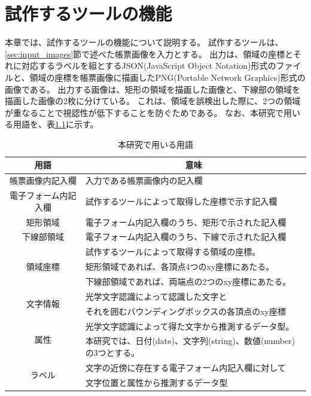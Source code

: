 \chapter{試作するツールの機能}\label{cha:Function}
本章では、試作するツールの機能について説明する。
試作するツールは、\ref{sec:input_images}節で述べた帳票画像を入力とする。
出力は、領域の座標とそれに対応するラベルを組とするJSON(JavaScript Object Notation)形式のファイルと、領域の座標を帳票画像に描画したPNG(Portable Network Graphics)形式の画像である。
出力する画像は、矩形の領域を描画した画像と、下線部の領域を描画した画像の2枚に分けている。
これは、領域を誤検出した際に、2つの領域が重なることで視認性が低下することを防ぐためである。
なお、本研究で用いる用語を、表\ref{tb:term}に示す。
\begin{table}[tp]
	\caption{本研究で用いる用語}
	\label{tb:term}
	\centering
	\begin{tabular}{|c||l|}
        \hline
		用語 & \multicolumn{1}{c|}{意味} \\
        \hline \hline
		帳票画像内記入欄 & 入力である帳票画像内の記入欄 \\
        \hline
		電子フォーム内記入欄 & 試作するツールによって取得した座標で示す記入欄 \\
        \hline
		矩形領域 & 電子フォーム内記入欄のうち、矩形で示された記入欄 \\
        \hline
		下線部領域 & 電子フォーム内記入欄のうち、下線で示された記入欄 \\
        \hline
        \multirow{3}{*}{領域座標} & 試作するツールによって取得する領域の座標。 \\
                                    & 矩形領域であれば、各頂点4つのxy座標にあたる。 \\
                                    & 下線部領域であれば、両端点の2つのxy座標にあたる。 \\
        \hline
        \multirow{2}{*}{文字情報} & 光学文字認識によって認識した文字と \\
                                    & それを囲むバウンディングボックスの各頂点のxy座標 \\
        \hline
        \multirow{2}{*}{属性} & 光学文字認識によって得た文字から推測するデータ型。 \\
                                & 本研究では、日付(date)、文字列(string)、数値(number)の3つとする。\\
        \hline
        \multirow{2}{*}{ラベル} & 文字の近傍に存在する電子フォーム内記入欄に対して \\
                                & 文字位置と属性から推測するデータ型 \\
        \hline
	\end{tabular}
\end{table}

